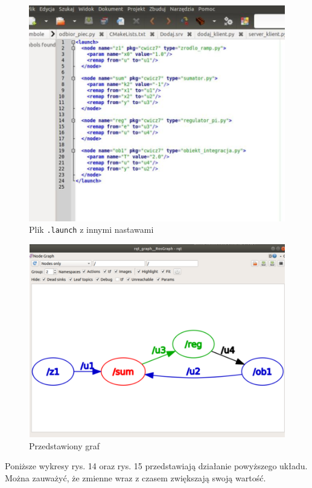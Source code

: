 \documentclass[10pt,a4paper,twoside,twocolumn]{article}%
\begin{document}
\begin{figure}[H]
    \centering
    \includegraphics[width=0.9\linewidth]{image13.png}
    \caption{Plik \texttt{.launch} z innymi nastawami}
\end{figure}

\begin{figure}[H]
    \centering
    \includegraphics[width=0.9\linewidth]{image14.png}
    \caption{Przedstawiony graf}
\end{figure}

Poniższe wykresy rys. 14 oraz rys. 15 przedstawiają działanie powyższego układu. Można zauważyć, że zmienne wraz z czasem zwiększają swoją wartość.
\end{document}
